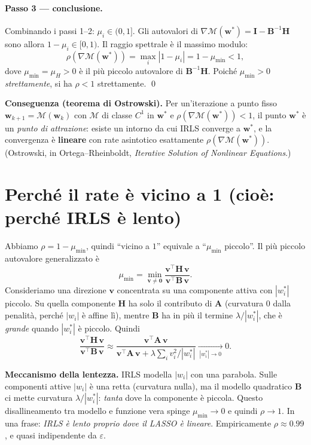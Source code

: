 \documentclass[11pt,a4paper]{article}
\theoremstyle{definition}
\newcommand{\w}{\bm{w}}
\newcommand{\A}{\bm{A}}
\newcommand{\Hess}{\bm{H}}
\newcommand{\Id}{\bm{I}}
\newcommand{\wstar}{\w^{*}}
\newcommand{\Mmap}{\mathcal{M}}
\newcommand{\spec}{\rho}
\newcommand{\lam}{\lambda}
\newcommand{\eps}{\varepsilon}
\begin{document}
\paragraph{Passo 3 --- conclusione.}
Combinando i passi 1--2: $\mu_i\in(0,1]$. Gli autovalori di
$\nabla\Mmap(\wstar)=\Id-\bm B^{-1}\Hess$ sono allora $1-\mu_i\in[0,1)$. Il raggio spettrale è
il massimo modulo:
\[
\spec(\nabla\Mmap(\wstar))=\max_i|1-\mu_i|=1-\mu_{\min}<1,
\]
dove $\mu_{\min}=\mu_H>0$ è il più piccolo autovalore di $\bm B^{-1}\Hess$. Poiché
$\mu_{\min}>0$ \emph{strettamente}, si ha $\spec<1$ strettamente. \qed

\begin{keybox}
\textbf{Conseguenza (teorema di Ostrowski).} Per un'iterazione a punto fisso
$\w_{k+1}=\Mmap(\w_k)$ con $\Mmap$ di classe $C^1$ in $\wstar$ e
$\spec(\nabla\Mmap(\wstar))<1$, il punto $\wstar$ è un \emph{punto di attrazione}: esiste un
intorno da cui IRLS converge a $\wstar$, e la convergenza è \textbf{lineare} con rate
asintotico esattamente $\spec(\nabla\Mmap(\wstar))$. (Ostrowski, in
Ortega--Rheinboldt, \emph{Iterative Solution of Nonlinear Equations}.)
\end{keybox}

\section{Perché il rate è vicino a 1 (cioè: perché IRLS è lento)}
\label{sec:slow}

Abbiamo $\spec=1-\mu_{\min}$, quindi ``vicino a $1$'' equivale a ``$\mu_{\min}$ piccolo''.
Il più piccolo autovalore generalizzato è
\[
\mu_{\min}=\min_{\bm v\neq\bm0}\frac{\bm v^{\!\top}\Hess\,\bm v}{\bm v^{\!\top}\bm B\,\bm v}.
\]
Consideriamo una direzione $\bm v$ concentrata su una componente attiva con $|w^*_i|$ piccolo.
Su quella componente $\Hess$ ha solo il contributo di $\A$ (curvatura $0$ dalla penalità,
perché $|w_i|$ è affine lì), mentre $\bm B$ ha in più il termine $\lam/|w^*_i|$, che è
\emph{grande} quando $|w^*_i|$ è piccolo. Quindi
\[
\frac{\bm v^{\!\top}\Hess\,\bm v}{\bm v^{\!\top}\bm B\,\bm v}
\approx\frac{\bm v^{\!\top}\A\,\bm v}{\bm v^{\!\top}\A\,\bm v+\lam\sum_i v_i^2/|w^*_i|}
\xrightarrow[\ |w^*_i|\to0\ ]{}0 .
\]

\begin{keybox}
\textbf{Meccanismo della lentezza.} IRLS modella $|w_i|$ con una parabola. Sulle componenti
attive $|w_i|$ è una retta (curvatura nulla), ma il modello quadratico $\bm B$ ci mette
curvatura $\lam/|w^*_i|$: \emph{tanta} dove la componente è piccola. Questo disallineamento
tra modello e funzione vera spinge $\mu_{\min}\to0$ e quindi $\spec\to1$. In una frase:
\emph{IRLS è lento proprio dove il LASSO è lineare}. Empiricamente $\spec\approx0.99$, e
quasi indipendente da $\eps$.
\end{keybox}
\end{document}
